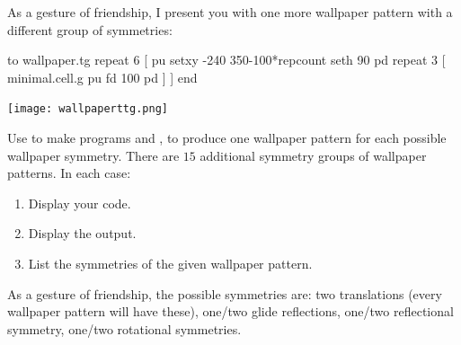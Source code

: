 \documentclass[noauthor,nooutcomes,12pt]{ximera}
\begin{document}
\begin{multicols*}{2}
As a gesture of friendship, I present you with one more wallpaper
pattern with a different group of symmetries:
\begin{logo}
to wallpaper.tg repeat 6 [
pu setxy -240 350-100*repcount seth 90 pd 
repeat 3 [
  minimal.cell.g pu fd 100 pd ] ]
end
\end{logo}
\begin{logoout}
    \texttt{[image: wallpaperttg.png]}
\end{logoout}
\enlargethispage{\baselineskip}
\end{multicols*}
\newpage


\begin{problem}
  Use  to make programs  and
  , to produce one wallpaper pattern for each possible
  wallpaper symmetry. There are $15$ additional symmetry groups of
  wallpaper patterns. In each case:
  \begin{enumerate}
  \item Display your code. 
  \item Display the output.
  \item List the symmetries of the given wallpaper pattern.
  \end{enumerate}
  As a gesture of friendship, the possible symmetries are: two
  translations (every wallpaper pattern will have these), one/two
  glide reflections, one/two reflectional symmetry, one/two rotational symmetries.
  
\end{problem}
\end{document}

